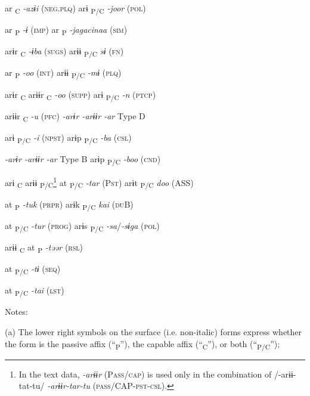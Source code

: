     ar\textsubscript{ C}  \textit{{}-azɨi} (\textsc{neg}.\textsc{plq})    arɨ\textsubscript{ P/C}      \textit{{}-joor} (\textsc{pol})

    ar \textsubscript{P}  \textit{{}-ɨ} (\textsc{imp})        ar\textsubscript{ P}  \textit{{}-jagacinaa} (\textsc{sim})

arɨr\textsubscript{ C}      \textit{{}-ɨba} (\textsc{sugs})      arɨɨ\textsubscript{ P/C}    \textit{sɨ}  (\textsc{fn})

    ar\textsubscript{ P}  \textit{{}-oo} (\textsc{int})      arɨɨ\textsubscript{ P/C}    \textit{{}-mɨ} (\textsc{plq})

arɨr\textsubscript{ C}  arɨɨr\textsubscript{ C}    \textit{{}-oo} (\textsc{supp})    arɨ\textsubscript{ P/C}      \textit{{}-n} (\textsc{ptcp})

  arɨɨr\textsubscript{ C}    \textit{{}-u} (\textsc{pfc})    \textit{{}-arɨr  {}-arɨɨr  {}-ar} Type D

arɨ\textsubscript{ P/C}      \textit{{}-i} (\textsc{npst})    arɨp\textsubscript{ P/C}      \textit{{}-ba} (\textsc{csl})

\textit{{}-arɨr  {}-arɨɨr  {}-ar} Type B    arɨp\textsubscript{ P/C}      \textit{{}-boo} (\textsc{cnd})

arɨ\textsubscript{ C}  arɨɨ\textsubscript{ P/C}\footnote{In the text data, \textit{{}-arɨɨr} (P\textsc{ass}/\textsc{cap}) is used only in the combination of /-arɨɨ-tat-tu/ \textit{{}-arɨɨr-tar-tu} (\textsc{pass}/CAP-\textsc{pst}-\textsc{csl}).}  at\textsubscript{ P/C}  \textit{{}-tar} (P\textsc{st})    arɨt\textsubscript{ P/C}      \textit{doo}  (ASS)

    at\textsubscript{ P}  \textit{{}-tuk} (\textsc{prpr})    arɨk\textsubscript{ P/C}      \textit{kai}  (\textsc{du}B)

    at\textsubscript{ P/C}  \textit{{}-tur} (\textsc{prog})    arɨs\textsubscript{ P/C}      \textit{{}-sa}/\textit{{}-sɨga}  (\textsc{pol})

  arɨɨ\textsubscript{ C}  at\textsubscript{ P}  \textit{{}-təər} (\textsc{rsl})

    at\textsubscript{ P/C}  \textit{{}-tɨ} (\textsc{seq})

    at\textsubscript{ P/C}  \textit{{}-tai} (\textsc{lst})

Notes:

(a) The lower right symbols on the surface (i.e. non-italic) forms express whether the form is the passive affix (“\textsubscript{P}”), the capable affix (“\textsubscript{C}”), or both (“\textsubscript{P/C}”);

